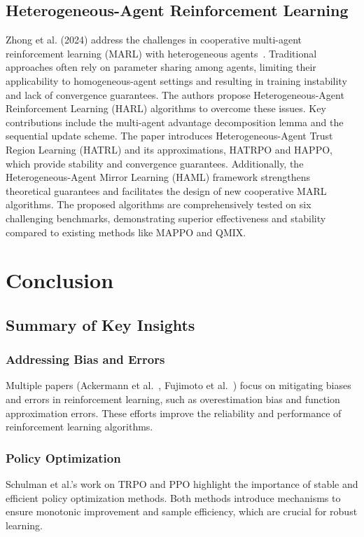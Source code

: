 \documentclass[journal]{IEEEtran}
\begin{document}
\subsection{Heterogeneous-Agent Reinforcement Learning} %
Zhong et al. (2024) address the challenges in cooperative multi-agent reinforcement learning (MARL)
with heterogeneous agents~\cite{zhong2024}. 
Traditional approaches often rely on parameter sharing among agents, limiting their applicability 
to homogeneous-agent settings and resulting in training instability and lack of convergence 
guarantees. The authors propose Heterogeneous-Agent Reinforcement Learning (HARL) algorithms 
to overcome these issues. Key contributions include the multi-agent 
advantage decomposition lemma and the sequential update scheme. 
The paper introduces Heterogeneous-Agent Trust Region Learning (HATRL) and its approximations, 
HATRPO and HAPPO, which provide stability and convergence guarantees. 
Additionally, the Heterogeneous-Agent Mirror Learning (HAML) framework strengthens theoretical 
guarantees and facilitates the design of new cooperative MARL algorithms. 
The proposed algorithms are comprehensively tested on six challenging benchmarks, demonstrating 
superior effectiveness and stability compared to existing methods like MAPPO and QMIX.

\section{Conclusion}
\label{sec:conclusion}

\subsection{Summary of Key Insights}
\subsubsection{Addressing Bias and Errors}
Multiple papers (Ackermann et al.~\cite{ackermann2019}, Fujimoto et al.~\cite{fujimoto2018}) 
focus on mitigating biases and errors in reinforcement learning, 
such as overestimation bias and function approximation errors. 
These efforts improve the reliability and performance of reinforcement learning algorithms.

\subsubsection{Policy Optimization} 
Schulman et al.'s work on TRPO\cite{schulman2017} and PPO\cite{schulman2017a} 
highlight the importance of stable and efficient policy optimization methods.
Both methods introduce mechanisms to ensure monotonic improvement and sample efficiency, 
which are crucial for robust learning.
\end{document}

